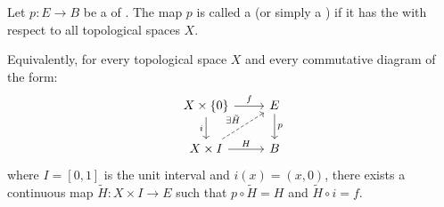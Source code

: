 \begin{definition} \label{definition:hurewicz_fibration_of_topological_spaces}
    Let $p: E \to B$ be a  of . 
    The map $p$ is called a  (or simply a ) if it has the  with respect to all topological spaces $X$. 

    Equivalently, for every topological space $X$ and every commutative diagram of the form:
    $$
    \begin{tikzcd}
    X \times \{0\} \arrow[r, "f"] \arrow[d, "i"'] & E \arrow[d, "p"] \\
    X \times I \arrow[r, "H"] \arrow[ur, "\exists \tilde{H}", dashed] & B
    \end{tikzcd}
    $$
    where $I = [0,1]$ is the unit interval and $i(x) = (x, 0)$, there exists a continuous map $\tilde{H}: X \times I \to E$ such that $p \circ \tilde{H} = H$ and $\tilde{H} \circ i = f$.
\end{definition}